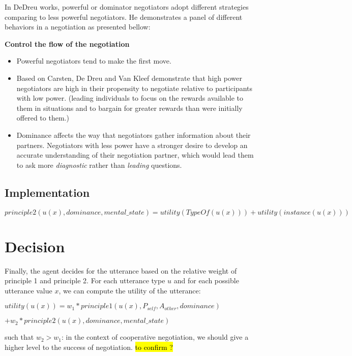 \documentclass{article}
\begin{document}
In DeDreu works, powerful or dominator negotiators adopt different strategies comparing to less powerful negotiators. He demonstrates a panel of different behaviors in a negotiation as presented bellow:
	
\textbf{Control the flow of the negotiation}
\begin{itemize}
	\item Powerful negotiators tend to make the first move. \cite{magee2007power}

	\item Based on Carsten, De Dreu and Van Kleef demonstrate that high power negotiators are high in their propensity to negotiate relative to participants with low power. (leading individuals to focus on the rewards available to them in situations and to bargain for	greater rewards than were initially offered to them.)

	\item Dominance affects the way that negotiators gather information about their partners. Negotiators with less power have a stronger desire to develop an accurate understanding of their negotiation partner, which would lead them to ask more \emph{diagnostic} rather than \emph{leading} questions.
	
\end{itemize} 

\subsection{Implementation}

$$principle2(u(x),dominance,mental\_state) = utility(TypeOf(u(x))) + utility(instance(u(x)))$$
\section{Decision}

Finally, the agent decides for the utterance based on the relative weight of principle 1 and principle 2. For each utterance type $u$ and for each possible utterance value $x$, we can compute the utility of the utterance:

$utility(u(x)) = w_1 * principle1(u(x),P_{self},A_{other},dominance)$

       $ + w_2 * principle2(u(x),dominance,mental\_state)$

such that $w_2 > w_1$: in the context of cooperative negotiation, we should give a higher level to the success of negotiation. \hl{ to confirm ?}



\vskip 4pt


\end{document}
